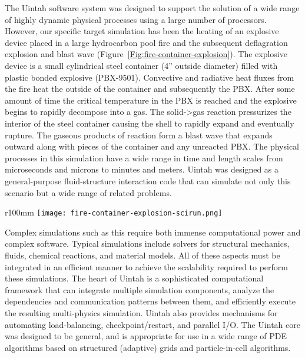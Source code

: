 The Uintah software system was designed to support the solution of a
wide range of highly dynamic physical processes using a large number
of processors.  However, our specific target simulation has been the
heating of an explosive device placed in a large hydrocarbon pool fire
and the subsequent deflagration explosion and blast wave
(Figure~\ref{Fig:fire-container-explosion}). The explosive device is a
small cylindrical steel container (4'' outside diameter) filled with
plastic bonded explosive (PBX-9501). Convective and radiative heat
fluxes from the fire heat the outside of the container and
subsequently the PBX. After some amount of time the critical
temperature in the PBX is reached and the explosive begins to rapidly
decompose into a gas. The solid->gas reaction pressurizes the interior
of the steel container causing the shell to rapidly expand and
eventually rupture. The gaseous products of reaction form a blast wave
that expands outward along with pieces of the container and any
unreacted PBX. The physical processes in this simulation have a wide
range in time and length scales from microseconds and microns to
minutes and meters.  Uintah was designed as a general-purpose
fluid-structure interaction code that can simulate not only this
scenario but a wide range of related problems.

\begin{wrapfigure}{r}{100mm}
  \texttt{[image: fire-container-explosion-scirun.png]}
  \caption{Target Simulation - Fire-Container-Explosion.}
  \label{Fig:fire-container-explosion}
\end{wrapfigure}


Complex simulations such as this require both immense computational
power and complex software. Typical simulations include solvers for
structural mechanics, fluids, chemical reactions, and material
models. All of these aspects must be integrated in an efficient manner
to achieve the scalability required to perform these simulations. The
heart of Uintah is a sophisticated computational framework that can
integrate multiple simulation components, analyze the dependencies and
communication patterns between them, and efficiently execute the
resulting multi-physics simulation.  Uintah also provides mechanisms
for automating load-balancing, checkpoint/restart, and parallel
I/O. The Uintah core was designed to be general, and is appropriate
for use in a wide range of PDE algorithms based on structured
(adaptive) grids and particle-in-cell algorithms.


